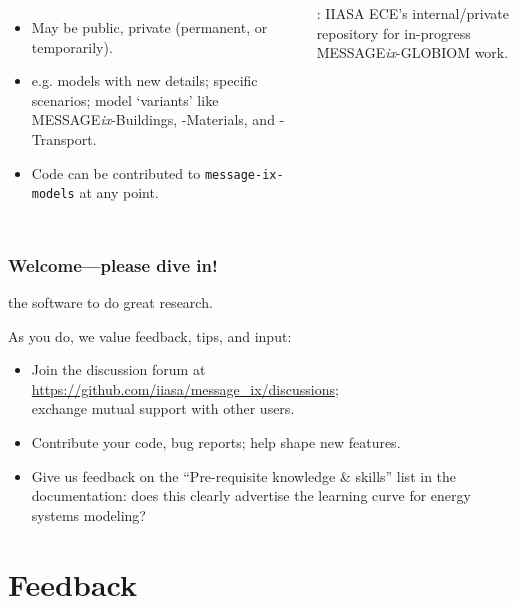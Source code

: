 \documentclass[12pt,aspectratio=169]{beamer}
\begin{document}
\begin{frame}
\begin{columns}[T]
{\smallskip
\begin{itemize}
  \item May be public, private (permanent, or temporarily).
  \item e.g. models with new details; specific scenarios; model ‘variants’ like MESSAGE\emph{ix}-Buildings, -Materials, and -Transport.
  \item Code can be contributed to \texttt{message-ix-models} at any point.
\end{itemize}

\smallskip
{}: IIASA ECE's internal/private repository for in-progress MESSAGE\emph{ix}-GLOBIOM work.
}

\end{columns}

\end{frame}

\begin{frame}
\frametitle{Welcome—please dive in!}

 the software to do great research.

\medskip
As you do, we value feedback, tips, and input:

\begin{itemize}
  \item Join the discussion forum at \url{https://github.com/iiasa/message_ix/discussions};\\ exchange mutual support with other users.
  \item Contribute your code, bug reports; help shape new features.
  \item Give us feedback on the “Pre-requisite knowledge \& skills” list in the documentation: does this clearly advertise the learning curve for energy systems modeling?
\end{itemize}

\end{frame}

\section{Feedback}
\end{document}
